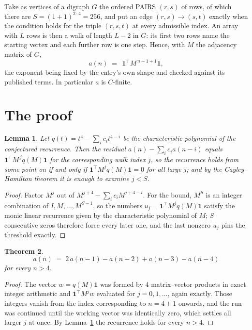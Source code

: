 \documentclass[11pt,a4paper]{article}
\theoremstyle{plain}
\newtheorem{theorem}{Theorem}
\newtheorem{lemma}[theorem]{Lemma}
\theoremstyle{definition}
\begin{document}
Take as vertices of a digraph $G$ the ordered PAIRS $(r,s)$ of rows, of which there are
$S=(1+1)^{2\cdot4}=256$, and put an edge $(r,s)\to(s,t)$ exactly when the condition
holds for the triple $(r,s,t)$ at every admissible index. An array with $L$ rows is then a
walk of length $L-2$ in $G$: its first two rows name the starting vertex and each further
row is one step. Hence, with $M$ the adjacency matrix of $G$,
\[
a(n)\;=\;\,\mathbf{1}^{\!\top}M^{\,n-1+1}\mathbf{1},
\]
the exponent being fixed by the entry's own shape and checked against its published terms.
In particular $a$ is $C$-finite.

\section{The proof}

\begin{lemma}\label{lem:crit}
Let $q(t)=t^{4}-\sum_i c_it^{4-i}$ be the characteristic polynomial of the
conjectured recurrence. Then the residual $a(n)-\sum_ic_ia(n-i)$ equals
$\mathbf{1}^{\!\top}M^{\,j}q(M)\mathbf{1}$ for the corresponding walk index
$j$, so the recurrence holds from some point on if and only if
$\mathbf{1}^{\!\top}M^{j}q(M)\mathbf{1}=0$ for all large $j$; and by the
Cayley--Hamilton theorem it is enough to examine $j<S$.
\end{lemma}

\begin{proof}
Factor $M^{j}$ out of $M^{j+4}-\sum_ic_iM^{j+4-i}$. For the bound, $M^{S}$
is an integer combination of $I,M,\dots,M^{S-1}$, so the numbers
$u_j=\mathbf{1}^{\!\top}M^{j}q(M)\mathbf{1}$ satisfy the monic linear recurrence given by
the characteristic polynomial of $M$; $S$ consecutive zeros therefore force every later one,
and the last nonzero $u_j$ pins the threshold exactly.
\end{proof}

\begin{theorem}
\[
a(n)\;=\;2\,a(n-1) - a(n-2) + a(n-3) - a(n-4)
\]
for every $n>4$.
\end{theorem}

\begin{proof}
The vector $w=q(M)\mathbf{1}$ was formed by $4$ matrix--vector products in exact
integer arithmetic and $\mathbf{1}^{\!\top}M^{j}w$ evaluated for $j=0,1,\dots$, again
exactly. Those integers vanish from the index corresponding to $n=4+1$ onwards, and the
run was continued until the working vector was identically zero, which settles all larger $j$
at once. By Lemma~\ref{lem:crit} the recurrence holds for every $n>4$.
\end{proof}
\end{document}
